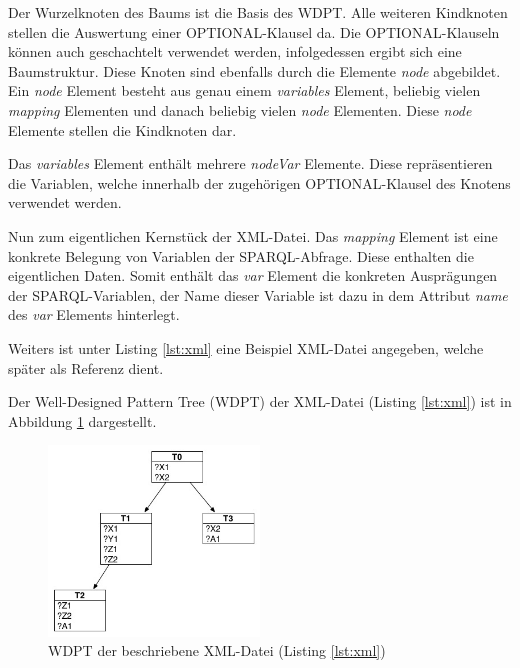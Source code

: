 \documentclass[draft,final]{vutinfth} %
\begin{document}
Der Wurzelknoten des Baums ist die Basis des WDPT. Alle weiteren Kindknoten stellen die Auswertung einer OPTIONAL-Klausel da. Die OPTIONAL-Klauseln können auch geschachtelt verwendet werden, infolgedessen ergibt sich eine Baumstruktur. Diese Knoten sind ebenfalls durch die Elemente \textit{node} abgebildet. Ein \textit{node} Element besteht aus genau einem \textit{variables} Element, beliebig vielen \textit{mapping} Elementen und danach beliebig vielen \textit{node} Elementen. Diese \textit{node} Elemente stellen die Kindknoten dar.

Das \textit{variables} Element enthält mehrere \textit{nodeVar} Elemente. Diese repräsentieren die Variablen, welche innerhalb der zugehörigen OPTIONAL-Klausel des Knotens verwendet werden.

Nun zum eigentlichen Kernstück der XML-Datei. Das \textit{mapping} Element ist eine konkrete Belegung von Variablen der SPARQL-Abfrage. Diese enthalten die eigentlichen Daten. Somit enthält das \textit{var} Element die konkreten Ausprägungen der SPARQL-Variablen, der Name dieser Variable ist dazu in dem Attribut \textit{name} des \textit{var} Elements hinterlegt.\\

\pagebreak


Weiters ist unter Listing \ref{lst:xml} eine Beispiel XML-Datei angegeben, welche später als Referenz dient.


Der Well-Designed Pattern Tree (WDPT) der XML-Datei (Listing \ref{lst:xml}) ist in Abbildung \ref{wdptBsp} dargestellt.
\begin{figure}[ht]
	\centering
	\includegraphics[width=0.5\textwidth]{WDPT}
	\caption{WDPT der beschriebene XML-Datei (Listing \ref{lst:xml})}
	\label{wdptBsp}
\end{figure}
\end{document}
